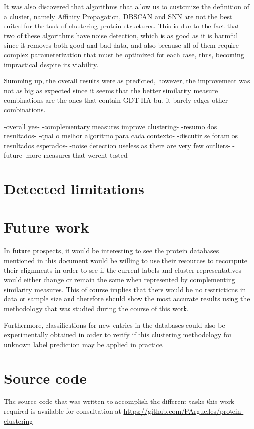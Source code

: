 It was also discovered that algorithms that allow us to customize the definition of a cluster, namely Affinity Propagation, DBSCAN and SNN are not the best suited for the task of clustering protein structures. This is due to the fact that two of these algorithms have noise detection, which is as good as it is harmful since it removes both good and bad data, and also because all of them require complex parameterization that must be optimized for each case, thus, becoming impractical despite its viability.

Summing up, the overall results were as predicted, however, the improvement was not as big as expected since it seems that the better similarity measure combinations are the ones that contain GDT-HA but it barely edges other combinations.



-overall yes-
-complementary measures improve clustering-
-resumo dos resultados-
-qual o melhor algoritmo para cada contexto-
-discutir se foram os resultados esperados-
-noise detection useless as there are very few outliers-
-future: more measures that werent tested-

\section{Detected limitations}



\section{Future work}

In future prospects, it would be interesting to see the protein databases mentioned in this document would be willing to use their resources to recompute their alignments in order to see if the current labels and cluster representatives would either change or remain the same when represented by complementing similarity measures. This of course implies that there would be no restrictions in data or sample size and therefore should show the most accurate results using the methodology that was studied during the course of this work.

Furthermore, classifications for new entries in the databases could also be experimentally obtained in order to verify if this clustering methodology for unknown label prediction may be applied in practice. 


\section{Source code}

The source code that was written to accomplish the different tasks this work required is available for consultation at \url{https://github.com/PArguelles/protein-clustering} 
